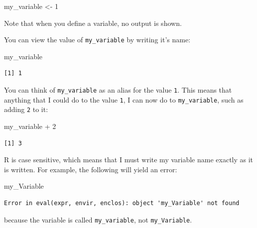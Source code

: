 \documentclass[
  letterpaper,
  DIV=11,
  numbers=noendperiod]{scrreprt}
\newenvironment{Shaded}{\begin{snugshade}}{\end{snugshade}}
\newcommand{\DecValTok}[1]{\textcolor[rgb]{0.68,0.00,0.00}{#1}}
\newcommand{\NormalTok}[1]{\textcolor[rgb]{0.00,0.23,0.31}{#1}}
\newcommand{\OtherTok}[1]{\textcolor[rgb]{0.00,0.23,0.31}{#1}}
\newcommand{\SpecialCharTok}[1]{\textcolor[rgb]{0.37,0.37,0.37}{#1}}
\begin{document}
\begin{Shaded}
\begin{Highlighting}[]
\NormalTok{my\_variable }\OtherTok{\textless{}{-}} \DecValTok{1} 
\end{Highlighting}
\end{Shaded}

Note that when you define a variable, no output is shown.

You can view the value of \texttt{my\_variable} by writing it's name:

\begin{Shaded}
\begin{Highlighting}[]
\NormalTok{my\_variable}
\end{Highlighting}
\end{Shaded}

\begin{verbatim}
[1] 1
\end{verbatim}

You can think of \texttt{my\_variable} as an alias for the value
\texttt{1}. This means that anything that I could do to the value
\texttt{1}, I can now do to \texttt{my\_variable}, such as adding
\texttt{2} to it:

\begin{Shaded}
\begin{Highlighting}[]
\NormalTok{my\_variable }\SpecialCharTok{+} \DecValTok{2}
\end{Highlighting}
\end{Shaded}

\begin{verbatim}
[1] 3
\end{verbatim}

\begin{tcolorbox}[enhanced jigsaw, rightrule=.15mm, toptitle=1mm, title=\textcolor{quarto-callout-tip-color}{\faLightbulb}\hspace{0.5em}{R is case sensitive}, leftrule=.75mm, bottomtitle=1mm, colbacktitle=quarto-callout-tip-color!10!white, coltitle=black, titlerule=0mm, opacityback=0, colframe=quarto-callout-tip-color-frame, arc=.35mm, opacitybacktitle=0.6, bottomrule=.15mm, left=2mm, breakable, toprule=.15mm, colback=white]

R is case sensitive, which means that I must write my variable name
exactly as it is written. For example, the following will yield an
error:

\begin{Shaded}
\begin{Highlighting}[]
\NormalTok{my\_Variable}
\end{Highlighting}
\end{Shaded}

\begin{verbatim}
Error in eval(expr, envir, enclos): object 'my_Variable' not found
\end{verbatim}

because the variable is called \texttt{my\_variable}, not
\texttt{my\_Variable}.

\end{tcolorbox}
\end{document}
